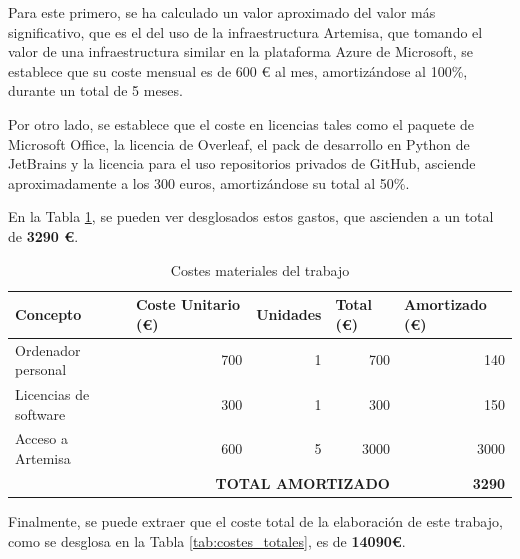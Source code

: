 Para este primero, se ha calculado un valor aproximado del valor más significativo, que es el del uso de la infraestructura Artemisa, que tomando el valor de una infraestructura similar en la plataforma Azure de Microsoft, se establece que su coste mensual es de 600 € al mes, amortizándose al 100\%, durante un total de 5 meses. 

Por otro lado, se establece que el coste en licencias tales como el paquete de Microsoft Office, la licencia de Overleaf, el pack de desarrollo en Python de JetBrains y la licencia para el uso repositorios privados de GitHub, asciende aproximadamente a los 300 euros, amortizándose su total al 50\%.

En la Tabla \ref{tab:costes_materiales}, se pueden ver desglosados estos gastos, que ascienden a un total de \textbf{3290 €}.

\begin{table}[h]
\caption{Costes materiales del trabajo}
\label{tab:costes_materiales}
\centering
\begin{tabular}{l|r|r|r|r}
\toprule
\textbf{Concepto}     & \multicolumn{1}{l|}{\textbf{Coste Unitario (€)}} & \multicolumn{1}{l|}{\textbf{Unidades}} & \multicolumn{1}{l|}{\textbf{Total (€)}} & \multicolumn{1}{l}{\textbf{Amortizado (€)}} \\ \hline
Ordenador personal    & 700                                              & 1                                      & 700                                     & 140                                         \\
Licencias de software & 300                                              & 1                                      & 300                                     & 150                                         \\
Acceso a Artemisa     & 600                                              & 5                                      & 3000                                    & 3000                                        \\ \hline
\multicolumn{4}{r|}{\textbf{TOTAL AMORTIZADO}}                                                                                                              & \textbf{3290}  \\
\bottomrule
\end{tabular}
\end{table}

Finalmente, se puede extraer que el coste total de la elaboración de este trabajo, como se desglosa en la Tabla \ref{tab:costes_totales}, es de \textbf{14090€}.

